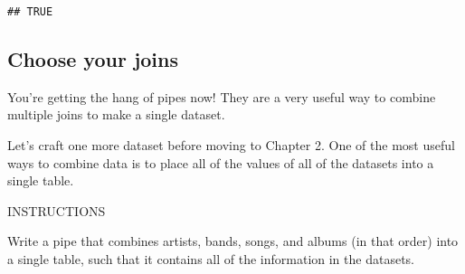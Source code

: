 \documentclass[]{article}
\newenvironment{Shaded}{\begin{snugshade}}{\end{snugshade}}
\newcommand{\KeywordTok}[1]{\textcolor[rgb]{0.13,0.29,0.53}{\textbf{#1}}}
\newcommand{\DataTypeTok}[1]{\textcolor[rgb]{0.13,0.29,0.53}{#1}}
\newcommand{\StringTok}[1]{\textcolor[rgb]{0.31,0.60,0.02}{#1}}
\newcommand{\CommentTok}[1]{\textcolor[rgb]{0.56,0.35,0.01}{\textit{#1}}}
\newcommand{\OperatorTok}[1]{\textcolor[rgb]{0.81,0.36,0.00}{\textbf{#1}}}
\newcommand{\NormalTok}[1]{#1}
\begin{document}
\begin{Shaded}
\end{Shaded}

\begin{verbatim}
## TRUE
\end{verbatim}

\subsection{Choose your joins}\label{choose-your-joins}

You're getting the hang of pipes now! They are a very useful way to
combine multiple joins to make a single dataset.

Let's craft one more dataset before moving to Chapter 2. One of the most
useful ways to combine data is to place all of the values of all of the
datasets into a single table.

INSTRUCTIONS

Write a pipe that combines artists, bands, songs, and albums (in that
order) into a single table, such that it contains all of the information
in the datasets.

\begin{Shaded}
\end{Shaded}
\end{document}
